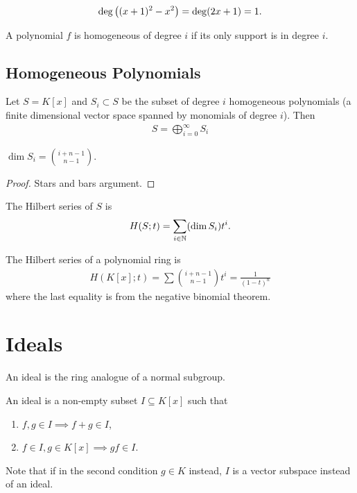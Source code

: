 \begin{example}
\begin{align*}
    \deg \left(  (x+1)^2 -x^2  \right) = \deg ( 2x+1 ) = 1.
\end{align*}
\end{example}

\begin{definition}
A polynomial $f$ is homogeneous of degree $i$ if its only support is in degree $i$.
\end{definition}

\subsection{Homogeneous Polynomials}

Let $S = K[x]$ and $S_i \subset S$ be the subset of degree $i $ homogeneous polynomials (a finite dimensional vector space spanned by monomials of degree $i$). Then
\begin{align*}
    S = \bigoplus_{i=0}^\infty S_i
\end{align*}

\begin{remark}
$\dim S_i = \binom{i+n-1}{n-1}$.
\end{remark}

\begin{proof}
Stars and bars argument.
\end{proof}

\begin{definition}
The Hilbert series of $S$ is
\begin{align*}
    H(S ; t) = \sum_{i \in \mathbb{N}} (\dim S_i) t^i.
\end{align*}
\end{definition}

\begin{remark}
The Hilbert series of a polynomial ring is
\begin{align*}
    H( K[x] ; t) = \sum \binom{i+n-1}{n-1} t^i = \frac{1}{(1-t)^n}
\end{align*}
where the last equality is from the negative binomial theorem.
\end{remark}

\section{Ideals}

An ideal is the ring analogue of a normal subgroup.

\begin{definition}[Ideal]
An ideal is a non-empty subset $I \subseteq K[x]$ such that
\begin{enumerate}
    \item $f,g \in I \implies f+ g \in I$,
    \item $f \in I, g \in K[x] \implies gf \in I$.
\end{enumerate}
Note that if in the second condition $g \in K$ instead, $I$ is a vector subspace instead of an ideal.
\end{definition}

